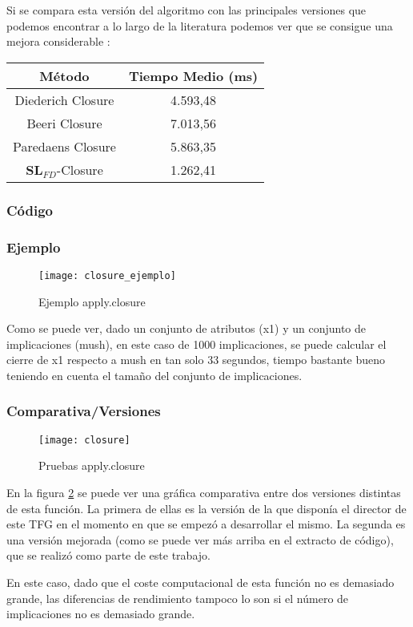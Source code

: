 Si se compara esta versi\'on del algoritmo con las principales versiones que podemos encontrar a lo largo de la literatura podemos ver que se consigue una mejora considerable \cite{Mora2012a}:

\begin{center}
    \begin{tabular}{c c}
        \hline
        M\'etodo & Tiempo Medio (ms) \\
        \hline
        Diederich Closure & 4.593,48 \\   
        Beeri Closure & 7.013,56 \\   
        Paredaens Closure & 5.863,35 \\  
        \(\textbf{SL}_{FD}\)-Closure & 1.262,41 \\  
    \end{tabular}
\end{center}
\newpage
\subsubsection{C\'odigo} 

\subsubsection{Ejemplo} 
\begin{figure}[h]
    \centering
    \texttt{[image: closure\_ejemplo]}
    \caption{Ejemplo apply.closure}
    \label{fig:closure_ejemplo}
\end{figure} 

Como se puede ver, dado un conjunto de atributos (x1) y un conjunto de implicaciones (mush), en este caso de 1000 implicaciones, se puede calcular el cierre de x1 respecto a mush en tan solo 33 segundos, tiempo bastante bueno teniendo en cuenta el tama\~no del conjunto de implicaciones.
\subsubsection{Comparativa/Versiones} 

\begin{figure}[H]
    \centering
    \texttt{[image: closure]}
    \caption{Pruebas apply.closure}
    \label{fig:closure}
\end{figure} 

En la figura \ref{fig:closure} se puede ver una gr\'afica comparativa entre dos versiones distintas de esta funci\'on. La primera de ellas es la versi\'on de la que dispon\'ia el director de este TFG en el momento en que se empez\'o a desarrollar el mismo. La segunda es una versi\'on mejorada (como se puede ver m\'as arriba en el extracto de c\'odigo), que se realiz\'o como parte de este trabajo.

En este caso, dado que el coste computacional de esta funci\'on no es demasiado grande, las diferencias de rendimiento tampoco lo son si el n\'umero de implicaciones no es demasiado grande.

